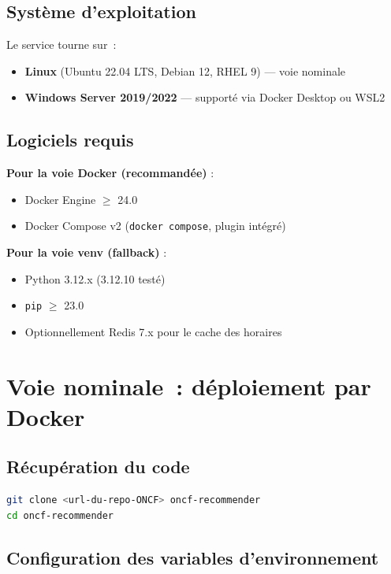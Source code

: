 \documentclass[11pt, a4paper]{article}
\begin{document}
\subsection{Système d'exploitation}

Le service tourne sur~:
\begin{itemize}
\item \textbf{Linux} (Ubuntu 22.04 LTS, Debian 12, RHEL 9) --- voie nominale
\item \textbf{Windows Server 2019/2022} --- supporté via Docker Desktop ou WSL2
\end{itemize}

\subsection{Logiciels requis}

\textbf{Pour la voie Docker (recommandée) }:
\begin{itemize}
\item Docker Engine $\geq$ 24.0
\item Docker Compose v2 (\texttt{docker compose}, plugin intégré)
\end{itemize}

\textbf{Pour la voie venv (fallback) }:
\begin{itemize}
\item Python 3.12.x (3.12.10 testé)
\item \texttt{pip} $\geq$ 23.0
\item Optionnellement Redis 7.x pour le cache des horaires
\end{itemize}

\section{Voie nominale~: déploiement par Docker}

\subsection{Récupération du code}

\begin{lstlisting}[language=bash]
git clone <url-du-repo-ONCF> oncf-recommender
cd oncf-recommender
\end{lstlisting}

\subsection{Configuration des variables d'environnement}
\end{document}
